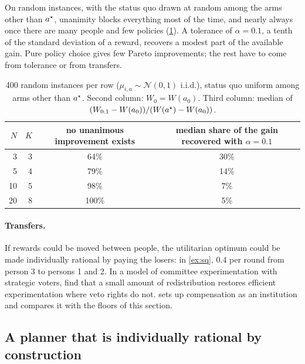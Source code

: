 On random instances, with the status quo drawn at random among the arms other than $a^\star$, unanimity blocks everything most of the time, and nearly always once there are many people and few policies (\cref{tab:ir}). A tolerance of $\alpha=0.1$, a tenth of the standard deviation of a reward, recovers a modest part of the available gain. Pure policy choice gives few Pareto improvements; the rest have to come from tolerance or from transfers.

\begin{table}[h]\centering\small
\begin{tabular}{rrcc}
\toprule
$N$ & $K$ & no unanimous improvement exists & median share of the gain recovered with $\alpha=0.1$\\
\midrule
3 & 3 & 64\% & 30\%\\
5 & 4 & 79\% & 14\%\\
10 & 5 & 98\% & 7\%\\
20 & 8 & 100\% & 5\%\\
\bottomrule
\end{tabular}
\caption{400 random instances per row ($\mu_{i,a}\sim\mathcal N(0,1)$ i.i.d.), status quo uniform among arms other than $a^\star$. Second column: $W_0=W(a_0)$. Third column: median of $(W_{0.1}-W(a_0))/(W(a^\star)-W(a_0))$.}
\label{tab:ir}
\end{table}

\paragraph{Transfers.} If rewards could be moved between people, the utilitarian optimum could be made individually rational by paying the losers: in \cref{ex:sq}, $0.4$ per round from person 3 to persons 1 and 2. In a model of committee experimentation with strategic voters, \citet{anesi2021} find that a small amount of redistribution restores efficient experimentation where veto rights do not.  sets up compensation as an institution and compares it with the floors of this section.

\subsection{A planner that is individually rational by construction}

